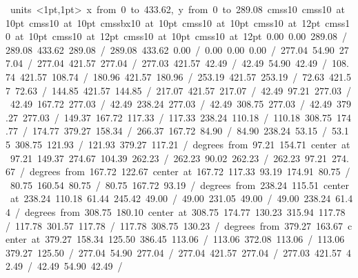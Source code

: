 \hbox{\beginpicture
\setcoordinatesystem units <1pt,1pt>
\setplotarea x from 0 to 433.62, y from 0 to 289.08
\setlinear
\font\picfont cmss10\picfont
\font\picfont cmss10 at 10pt\picfont
\font\picfont cmss10 at 10pt\picfont
\font\picfont cmssbx10 at 10pt\picfont
\font\picfont cmss10 at 10pt\picfont
\font\picfont cmss10 at 12pt\picfont
\font\picfont cmss10 at 10pt\picfont
\font\picfont cmss10 at 12pt\picfont
\font\picfont cmss10 at 10pt\picfont
\font\picfont cmss10 at 12pt\picfont
\setsolid
{} 0.00 0.00 289.08 /
 289.08 433.62 289.08 /
 289.08 433.62 0.00 /
 0.00 0.00 0.00 /
\setsolid
{} 277.04 54.90 277.04 /
 277.04 421.57 277.04 /
 277.03 421.57 42.49 /
 42.49 54.90 42.49 /
\setsolid
{} 108.74 421.57 108.74 /
\setsolid
{} 180.96 421.57 180.96 /
\setsolid
{} 253.19 421.57 253.19 /
\setsolid
{} 72.63 421.57 72.63 /
\setsolid
{} 144.85 421.57 144.85 /
\setsolid
{} 217.07 421.57 217.07 /
\setsolid
{} 42.49 97.21 277.03 /
\setsolid
{} 42.49 167.72 277.03 /
\setsolid
{} 42.49 238.24 277.03 /
\setsolid
{} 42.49 308.75 277.03 /
\setsolid
{} 42.49 379.27 277.03 /
\setsolid
{} 149.37 167.72 117.33 /
 117.33 238.24 110.18 /
 110.18 308.75 174.77 /
 174.77 379.27 158.34 /
\setsolid
{} 266.37 167.72 84.90 /
 84.90 238.24 53.15 /
 53.15 308.75 121.93 /
 121.93 379.27 117.21 /
 degrees from 97.21 154.71 center at 97.21 149.37
\setsolid
{} 274.67 104.39 262.23 /
 262.23 90.02 262.23 /
 262.23 97.21 274.67 /
 degrees from 167.72 122.67 center at 167.72 117.33
\setsolid
{} 93.19 174.91 80.75 /
 80.75 160.54 80.75 /
 80.75 167.72 93.19 /
 degrees from 238.24 115.51 center at 238.24 110.18
\setsolid
{} 61.44 245.42 49.00 /
 49.00 231.05 49.00 /
 49.00 238.24 61.44 /
 degrees from 308.75 180.10 center at 308.75 174.77
\setsolid
{} 130.23 315.94 117.78 /
 117.78 301.57 117.78 /
 117.78 308.75 130.23 /
 degrees from 379.27 163.67 center at 379.27 158.34
\setsolid
{} 125.50 386.45 113.06 /
 113.06 372.08 113.06 /
 113.06 379.27 125.50 /
\setsolid
{} 277.04 54.90 277.04 /
 277.04 421.57 277.04 /
 277.03 421.57 42.49 /
 42.49 54.90 42.49 /
}
